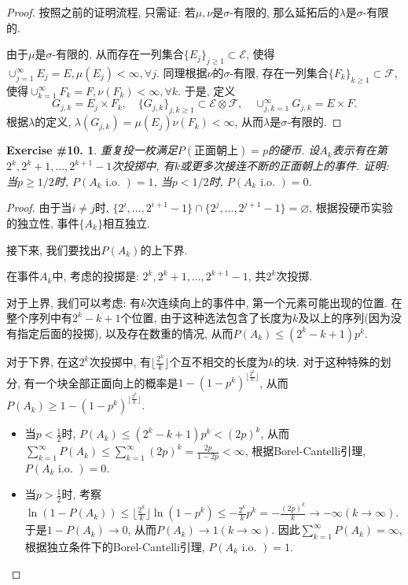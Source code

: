 \documentclass[UTF8, a4paper]{article}
\newtheorem{exercise}{Exercise \#10.}
\begin{document}
\begin{proof}
按照之前的证明流程, 只需证: 若\(\mu, \nu\)是\(\sigma\)-有限的, 那么延拓后的\(\lambda\)是\(\sigma\)-有限的.

由于\(\mu\)是\(\sigma\)-有限的, 从而存在一列集合\(\{E_j\}_{j\geq 1} \subset \mathcal{E}\), 使得\(\cup_{j=1}^\infty E_j = E, \mu(E_j) < \infty, \forall j\).
同理根据\(\nu\)的\(\sigma\)-有限, 存在一列集合\(\{F_k\}_{k\geq 1} \subset \mathcal{F}\), 使得\(\cup_{k=1}^\infty F_k = F, \nu(F_k) < \infty, \forall k\).
于是, 定义 
$$
G_{j,k} = E_j \times F_k, \quad \{G_{j,k}\}_{j,k\geq 1} \subset \mathcal{E} \otimes \mathcal{F}, \quad \cup_{j,k=1}^\infty G_{j,k} = E\times F.
$$
根据\(\lambda\)的定义, \(\lambda(G_{j,k}) = \mu(E_j)\nu(F_k) < \infty\), 从而\(\lambda\)是\(\sigma\)-有限的.
\end{proof}


\begin{framed}
\begin{exercise}
重复投一枚满足\(P(\text{正面朝上}) = p\)的硬币. 
设\(A_k\)表示有在第\(2^k, 2^k+1, ..., 2^{k+1} - 1\)次投掷中, 有\(k\)或更多次接连不断的正面朝上的事件.
证明: 当\(p \geq 1/2\)时, \(P(A_k\text { i.o. }) = 1\), 当\(p<1/2\)时, \(P(A_k\text { i.o. }) = 0\).
\end{exercise}
\end{framed}

\begin{proof}
由于当\(i\neq j\)时, \(\{2^i, ..., 2^{i+1} - 1\} \cap \{2^j, ..., 2^{j+1} - 1\} = \varnothing\), 根据投硬币实验的独立性, 事件\(\{A_k\}\)相互独立.

接下来, 我们要找出\(P(A_k)\)的上下界.

在事件\(A_k\)中, 考虑的投掷是: \(2^k, 2^k+1, ..., 2^{k+1} - 1\), 共\(2^k\)次投掷.

对于上界, 我们可以考虑: 有\(k\)次连续向上的事件中, 第一个元素可能出现的位置. 在整个序列中有\(2^k - k + 1\)个位置, 由于这种选法包含了长度为\(k\)及以上的序列(因为没有指定后面的投掷), 以及存在数重的情况, 从而\(P(A_k) \leq (2^k - k + 1)p^k\).

对于下界, 在这\(2^k\)次投掷中, 有\(\lfloor \frac{2^k}{k}\rfloor\)个互不相交的长度为\(k\)的块.
对于这种特殊的划分, 有一个块全部正面向上的概率是\(1 - (1 - p^k)^{\lfloor \frac{2^k}{k}\rfloor}\), 从而
\(P(A_k) \geq 1 - (1 - p^k)^{\lfloor \frac{2^k}{k}\rfloor}\).

\begin{itemize}
    \item 当\(p < \frac{1}{2}\)时, \(P(A_k) \leq (2^k - k + 1) p^k <(2p)^k\), 从而\(\sum_{k=1}^{\infty} P(A_k) \leq \sum_{k=1}^{\infty} (2p)^k = \frac{2p}{1-2p} < \infty\), 根据Borel-Cantelli引理, \(P(A_k \text{ i.o. }) = 0\).
    \item 当\(p > \frac{1}{2}\)时, 考察\(\ln(1 - P(A_k)) \leq \lfloor \frac{2^k}{k} \rfloor \ln(1 - p^k) \leq -\frac{2^k}{k}p^k = -\frac{(2p)^k}{k} \to -\infty(k \to \infty)\). 于是\(1 - P(A_k) \to 0\), 从而\(P(A_k) \to 1(k \to \infty)\). 因此\(\sum_{k=1}^{\infty}P(A_k) = \infty\), 根据独立条件下的Borel-Cantelli引理, \(P(A_k \text{ i.o. }) = 1\).
\end{itemize}


\end{proof}
\end{document}

